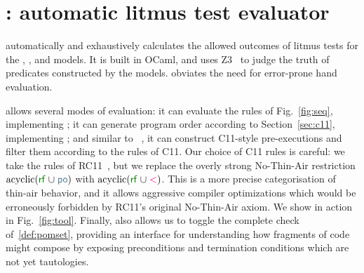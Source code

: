 \section{\PwTerTITLE: automatic litmus test evaluator}
\label{sec:tool}

\PwTer{} automatically and exhaustively calculates the allowed outcomes of litmus tests for the \PwT, \PwTpo, and \PwTc{} models. It is built in OCaml, and uses Z3~\cite{Z3Solver} to judge the truth of predicates constructed by the models. \PwTer{} obviates the need for error-prone hand evaluation.

\PwTer{} allows several modes of evaluation: it can evaluate the rules of Fig.~\ref{fig:seq}, implementing \PwT; it can generate program order according to Section~\ref{sec:c11}, implementing \PwTpo; and similar to \MRD~\cite{DBLP:conf/esop/PaviottiCPWOB20}, it can construct C11-style pre-executions and filter them according to the rules of C11.
Our choice of C11 rules is careful: we take the rules of RC11~\cite{DBLP:conf/pldi/LahavVKHD17}, but we replace the overly strong No-Thin-Air restriction $\text{acyclic}(\rrf\cup\rpox)$ with $\text{acyclic}(\rrf\cup\lt)$. 
This is a more precise categorisation of thin-air behavior, and it allows aggressive compiler optimizations which would be erroneously forbidden by RC11's original No-Thin-Air axiom.
We show \PwTer{} in action in Fig.~\ref{fig:tool}.
Finally, \PwTer{} also allows us to toggle the complete check of~\ref{def:pomset}, providing an interface for understanding how fragments of code might compose by exposing preconditions and termination conditions which are not yet tautologies.






